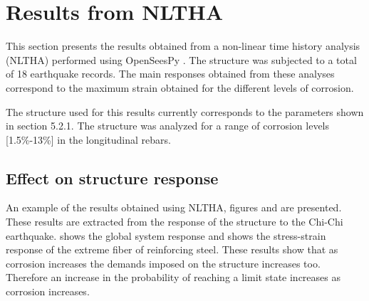 %
%
\section{Results from NLTHA}
This section presents the results obtained from a non-linear time history analysis (NLTHA) performed using OpenSeesPy \cite{Zhu2018}. The structure was subjected to a total of 18 earthquake records. The main responses obtained from these analyses correspond to the maximum strain obtained for the different levels of corrosion. 

The structure used for this results currently corresponds to the parameters shown in section 5.2.1. The structure was analyzed for a range of corrosion levels [1.5\%-13\%] in the longitudinal rebars.

\subsection{Effect on structure response}
An example of the results obtained using NLTHA, figures  and  are presented. These results are extracted from the response of the structure to the Chi-Chi earthquake.  shows the global system response and  shows the stress-strain response of the extreme fiber of reinforcing steel. These results show that as corrosion increases the demands imposed on the structure increases too. Therefore an increase in the probability of reaching a limit state increases as corrosion increases.

